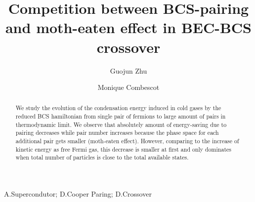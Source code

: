 \documentclass[aps,prb,showpacs,3p,twocolumn]{elsarticle}
\begin{document}
\title{Competition between BCS-pairing and moth-eaten effect in BEC-BCS crossover}
\author[uiuc]{Guojun Zhu}
\author[uiuc,upmc]{Monique Combescot}

\address[uiuc]{Department of Physics, University of Illinois at Urbana-Champaign, 1110 W Green St, Urbana, IL, 61801}

\address[upmc]{Institut des NanoSciences de Paris, Universite Pierre et Marie Curie, CNRS, Tour 22, 4 place Jussieu, 75005 Paris }

\newcommand{\td}{{\ensuremath{{\text{(2D)}}}}}
\newcommand{\sd}{{\ensuremath{{\text{(3D)}}}}}
\newcommand{\Arctg}{\ensuremath{\text{Arctg}}}



\begin{abstract}
We study the evolution of the condensation energy induced in cold gases by the  reduced BCS hamiltonian from single pair of fermions to large amount of pairs in thermodynamic limit.  We observe that absolutely amount of energy-saving due to pairing decreases while pair number increases because the phase space for each additional pair gets smaller (moth-eaten effect).  However, comparing to the increase of kinetic energy as free Fermi gas, this decrease is smaller at first and only dominates  when total number of particles is close to the total available states.  
\end{abstract}
\begin{keyword}
A.Supercondutor; D.Cooper Paring; D.Crossover
\end{keyword}

\maketitle
\end{document}
